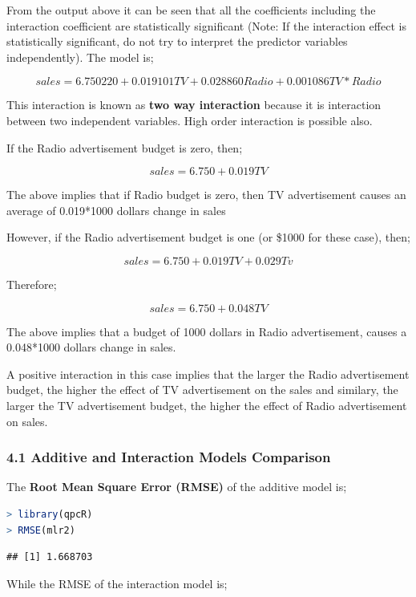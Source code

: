\documentclass[
]{article}
\begin{document}
From the output above it can be seen that all the coefficients including
the interaction coefficient are statistically significant (Note: If the
interaction effect is statistically significant, do not try to interpret
the predictor variables independently). The model is;

\[sales=6.750220 +0.019101TV+0.028860Radio+  0.001086TV*Radio\]

This interaction is known as \textbf{two way interaction} because it is
interaction between two independent variables. High order interaction is
possible also.

If the Radio advertisement budget is zero, then;

\[sales=6.750+0.019TV\]

The above implies that if Radio budget is zero, then TV advertisement
causes an average of 0.019*1000 dollars change in sales

However, if the Radio advertisement budget is one (or \$1000 for these
case), then;

\[sales=6.750+0.019TV+0.029Tv\]

Therefore;

\[sales=6.750+0.048TV\]

The above implies that a budget of 1000 dollars in Radio advertisement,
causes a 0.048*1000 dollars change in sales.

A positive interaction in this case implies that the larger the Radio
advertisement budget, the higher the effect of TV advertisement on the
sales and similary, the larger the TV advertisement budget, the higher
the effect of Radio advertisement on sales.

\hypertarget{additive-and-interaction-models-comparison}{%
\subsubsection{4.1 Additive and Interaction Models
Comparison}\label{additive-and-interaction-models-comparison}}

The \textbf{Root Mean Square Error (RMSE)} of the additive model is;

\begin{lstlisting}[language=R]
> library(qpcR)
> RMSE(mlr2)
\end{lstlisting}

\begin{lstlisting}
## [1] 1.668703
\end{lstlisting}

While the RMSE of the interaction model is;
\end{document}
